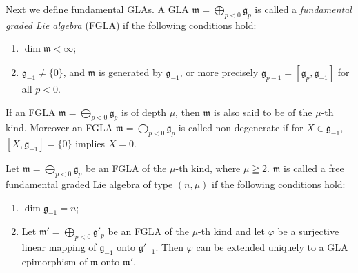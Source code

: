 Next we def\/ine fundamental GLAs.
A GLA $\mathfrak m=\bigoplus\limits_{p<0}\mathfrak g_p$ is
called a \textit{fundamental graded Lie algebra} (FGLA)
if the following conditions hold:
\begin{enumerate}\itemsep=0pt
\renewcommand{\labelenumi}{$(\roman{enumi})$}
\item $\dim \mathfrak m<\infty$;
\item $\mathfrak g_{-1}\ne\{0\}$, and $\mathfrak m$ is generated by $\mathfrak g_{-1}$,
or more precisely $\mathfrak g_{p-1}=[\mathfrak g_p,\mathfrak g_{-1}]$
for all $p<0$.
\end{enumerate}
If an FGLA $\mathfrak m=\bigoplus\limits_{p<0}\mathfrak g_p$
is of depth $\mu$, then $\mathfrak m$
is also said to be of the $\mu$-th kind.
Moreover an FGLA $\mathfrak m=\bigoplus\limits_{p<0}\mathfrak g_p$ is called non-degenerate if
for $X\in\mathfrak g_{-1}$, $[X,\mathfrak g_{-1}]=\{0\}$ implies $X=0$.
\par
Let $\mathfrak m=\bigoplus\limits_{p<0}\mathfrak g_p$ be an FGLA of
the $\mu$-th kind, where $\mu\geqq2$. $\mathfrak m$ is called a free
fundamental graded Lie algebra of type $(n,\mu)$
if the following conditions hold:
\begin{enumerate}\itemsep=0pt
\renewcommand{\labelenumi}{$(\roman{enumi})$}
\item $\dim \mathfrak g_{-1}=n$;
\item Let $\mathfrak m'=\bigoplus\limits_{p<0}\mathfrak g'_p$ be an FGLA
of the $\mu$-th kind and let $\varphi$ be a surjective linear
mapping of $\mathfrak g_{-1}$ onto $\mathfrak g'_{-1}$.
Then $\varphi$ can be extended uniquely to a GLA
epimorphism of $\mathfrak m$ onto $\mathfrak m'$.
\end{enumerate}

